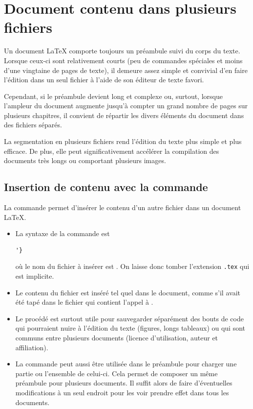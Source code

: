 \chapter{Document contenu dans plusieurs fichiers}

Un document {\LaTeX} comporte toujours un préambule suivi du corps du
texte. Lorsque ceux-ci sont relativement courts (peu de commandes
spéciales et moins d'une vingtaine de pages de texte), il demeure
assez simple et convivial d'en faire l'édition dans un seul fichier à
l'aide de son éditeur de texte favori.

Cependant, si le préambule devient long et complexe ou, surtout,
lorsque l'ampleur du document augmente jusqu'à compter un grand nombre
de pages sur plusieurs chapitres, il convient de répartir les divers
éléments du document dans des fichiers séparés.

La segmentation en plusieurs fichiers rend l'édition du texte plus
simple et plus efficace. De plus, elle peut significativement
accélérer la compilation des documents très longs ou comportant
plusieurs images.


\section{Insertion de contenu avec la commande }
\label{sec:include:input}

La commande \cmd{} permet d'insérer le contenu d'un autre fichier
dans un document {\LaTeX}.
\begin{itemize}
\item La syntaxe de la commande est
\begin{lstlisting}
'}
\end{lstlisting}
  où le nom du fichier à insérer est . On
  laisse donc tomber l'extension \verb=.tex= qui est implicite.
\item Le contenu du fichier est inséré tel quel dans le document,
  comme s'il avait été tapé dans le fichier qui contient l'appel à
  \cmd{}.
\item Le procédé est surtout utile pour sauvegarder séparément des
  bouts de code qui pourraient nuire à l'édition du texte (figures,
  longs tableaux) ou qui sont communs entre plusieurs documents
  (licence d'utilisation, auteur et affiliation).
\item La commande peut aussi être utilisée dans le préambule pour
  charger une partie ou l'ensemble de celui-ci. Cela permet de
  composer un même préambule pour plusieurs documents. Il
  suffit alors de faire d'éventuelles modifications à un seul endroit pour
  les voir prendre effet dans tous les documents.
\end{itemize}


